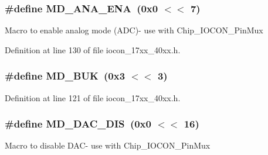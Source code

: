 \subsubsection[{\texorpdfstring{M\+D\+\_\+\+A\+N\+A\+\_\+\+E\+NA}{MD_ANA_ENA}}]{\setlength{\rightskip}{0pt plus 5cm}\#define M\+D\+\_\+\+A\+N\+A\+\_\+\+E\+NA~(0x0 $<$$<$ 7)}\hypertarget{group__IOCON__17XX__40XX_ga981e8fc7f82693378a8856bea0b435b7}{}\label{group__IOCON__17XX__40XX_ga981e8fc7f82693378a8856bea0b435b7}
Macro to enable analog mode (A\+DC)-\/ use with Chip\+\_\+\+I\+O\+C\+O\+N\+\_\+\+Pin\+Mux 

Definition at line 130 of file iocon\+\_\+17xx\+\_\+40xx.\+h.

\subsubsection[{\texorpdfstring{M\+D\+\_\+\+B\+UK}{MD_BUK}}]{\setlength{\rightskip}{0pt plus 5cm}\#define M\+D\+\_\+\+B\+UK~(0x3 $<$$<$ 3)}\hypertarget{group__IOCON__17XX__40XX_gaf637c444b0cbcd50aeaa4c4e34fbbd91}{}\label{group__IOCON__17XX__40XX_gaf637c444b0cbcd50aeaa4c4e34fbbd91}


Definition at line 121 of file iocon\+\_\+17xx\+\_\+40xx.\+h.

\subsubsection[{\texorpdfstring{M\+D\+\_\+\+D\+A\+C\+\_\+\+D\+IS}{MD_DAC_DIS}}]{\setlength{\rightskip}{0pt plus 5cm}\#define M\+D\+\_\+\+D\+A\+C\+\_\+\+D\+IS~(0x0 $<$$<$ 16)}\hypertarget{group__IOCON__17XX__40XX_gaec6eb0c4c1101d5c5dc64ef56a5a5588}{}\label{group__IOCON__17XX__40XX_gaec6eb0c4c1101d5c5dc64ef56a5a5588}
Macro to disable D\+A\+C-\/ use with Chip\+\_\+\+I\+O\+C\+O\+N\+\_\+\+Pin\+Mux 

